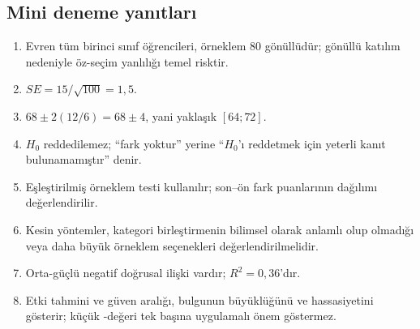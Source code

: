 \subsection*{Mini deneme yanıtları}

\begin{enumerate}
  \item Evren tüm birinci sınıf öğrencileri, örneklem 80 gönüllüdür; gönüllü
  katılım nedeniyle öz-seçim yanlılığı temel risktir.
  \item $SE=15/\sqrt{100}=1{,}5$.
  \item $68\pm2(12/6)=68\pm4$, yani yaklaşık $[64;72]$.
  \item $H_0$ reddedilemez; ``fark yoktur'' yerine ``$H_0$'ı reddetmek için
  yeterli kanıt bulunamamıştır'' denir.
  \item Eşleştirilmiş örneklem \tstat testi kullanılır; son--ön fark puanlarının
  dağılımı değerlendirilir.
  \item Kesin yöntemler, kategori birleştirmenin bilimsel olarak anlamlı olup
  olmadığı veya daha büyük örneklem seçenekleri değerlendirilmelidir.
  \item Orta-güçlü negatif doğrusal ilişki vardır; $R^2=0{,}36$'dır.
  \item Etki tahmini ve güven aralığı, bulgunun büyüklüğünü ve hassasiyetini
  gösterir; küçük \pval-değeri tek başına uygulamalı önem göstermez.
\end{enumerate}

